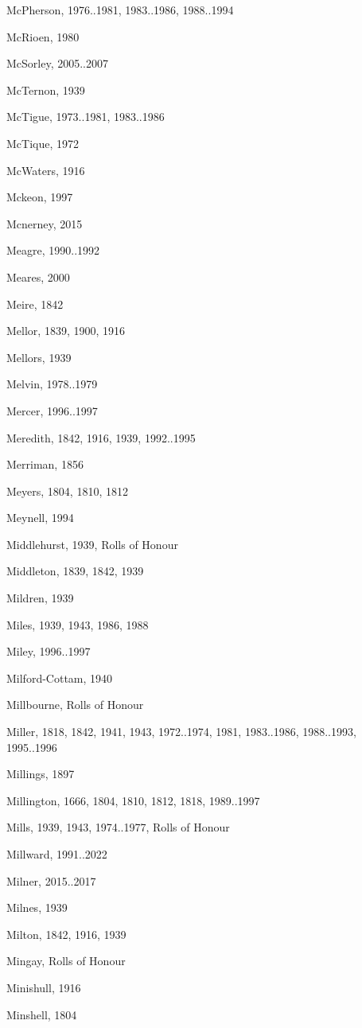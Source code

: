 {\begin{theindex}
\item McPherson, 1976..1981, 1983..1986, 1988..1994
\item McRioen, 1980
\item McSorley, 2005..2007
\item McTernon, 1939
\item McTigue, 1973..1981, 1983..1986
\item McTique, 1972
\item McWaters, 1916
\item Mckeon, 1997
\item Mcnerney, 2015
\item Meagre, 1990..1992
\item Meares, 2000
\item Meire, 1842
\item Mellor, 1839, 1900, 1916
\item Mellors, 1939
\item Melvin, 1978..1979
\item Mercer, 1996..1997
\item Meredith, 1842, 1916, 1939, 1992..1995
\item Merriman, 1856
\item Meyers, 1804, 1810, 1812
\item Meynell, 1994
\item Middlehurst, 1939, Rolls of Honour
\item Middleton, 1839, 1842, 1939
\item Mildren, 1939
\item Miles, 1939, 1943, 1986, 1988
\item Miley, 1996..1997
\item Milford-Cottam, 1940
\item Millbourne, Rolls of Honour
\item Miller, 1818, 1842, 1941, 1943, 1972..1974, 1981, 1983..1986, 1988..1993, 1995..1996
\item Millings, 1897
\item Millington, 1666, 1804, 1810, 1812, 1818, 1989..1997
\item Mills, 1939, 1943, 1974..1977, Rolls of Honour
\item Millward, 1991..2022
\item Milner, 2015..2017
\item Milnes, 1939
\item Milton, 1842, 1916, 1939
\item Mingay, Rolls of Honour
\item Minishull, 1916
\item Minshell, 1804

\end{theindex}}
